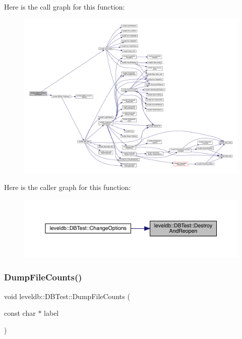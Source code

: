 Here is the call graph for this function\+:
\nopagebreak
\begin{figure}[H]
\begin{center}
\leavevmode
\includegraphics[width=350pt]{classleveldb_1_1_d_b_test_a3ccf08a024e805e70b723887e6dbfdae_cgraph}
\end{center}
\end{figure}
Here is the caller graph for this function\+:
\nopagebreak
\begin{figure}[H]
\begin{center}
\leavevmode
\includegraphics[width=350pt]{classleveldb_1_1_d_b_test_a3ccf08a024e805e70b723887e6dbfdae_icgraph}
\end{center}
\end{figure}
\mbox{\label{classleveldb_1_1_d_b_test_ad045c5203b4ea785ab335ffc3ea833b3}} 
\subsubsection{\texorpdfstring{DumpFileCounts()}{DumpFileCounts()}}
{\footnotesize\ttfamily void leveldb\+::\+D\+B\+Test\+::\+Dump\+File\+Counts (\begin{DoxyParamCaption}\item[{const char $\ast$}]{label }\end{DoxyParamCaption})\hspace{0.3cm}{\ttfamily [inline]}}


